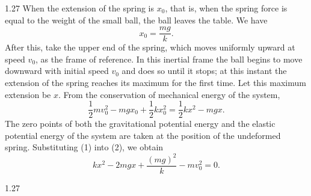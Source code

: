 \begin{solution}{1.27}
When the extension of the spring is $x_0$, that is, when the spring force is equal to the
weight of the small ball, the ball leaves the table. We have
\begin{equation}
x_0=\frac{mg}{k}. \tag{1}
\end{equation}
After this, take the upper end of the spring, which moves uniformly upward at speed $v_0$, as
the frame of reference. In this inertial frame the ball begins to move downward with initial
speed $v_0$ and does so until it stops; at this instant the extension of the spring reaches its
maximum for the first time. Let this maximum extension be $x$. From the conservation of
mechanical energy of the system,
\begin{equation}
\frac{1}{2}mv_0^2-mgx_0+\frac{1}{2}kx_0^2=\frac{1}{2}kx^2-mgx. \tag{2}
\end{equation}
The zero points of both the gravitational potential energy and the elastic potential energy of
the system are taken at the position of the undeformed spring. Substituting (1) into (2), we
obtain
\begin{equation}
kx^2-2mgx+\frac{(mg)^2}{k}-mv_0^2=0. \tag{3}
\end{equation}

\begin{figbox}{1.27}
\end{figbox}


\end{solution}
